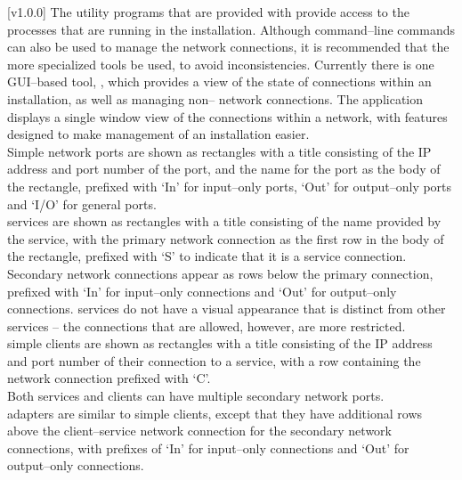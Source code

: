 [v1.0.0]
The utility programs that are provided with \mplusm{} provide access to the processes that
are running in the \mplusm{} installation.
Although command--line \yarp{} commands can also be used to manage the network
connections, it is recommended that the more specialized \mplusm{} tools be used, to avoid
inconsistencies.
Currently there is one GUI--based tool, ,
which provides a view of the state of connections within an \mplusm{} installation, as
well as managing non--\mplusm{} \yarp{} network connections.
The  application displays a single window
view of the connections within a \yarp{} network, with features designed to make
management of an \mplusm{} installation easier.\\

Simple \yarp{} network ports are shown as rectangles with a title consisting of the IP
address and port number of the port, and the \yarp{} name for the port as the body of the
rectangle, prefixed with `In' for input--only ports, `Out' for output--only ports and
`I/O' for general ports.\\

\mplusm{} services are shown as rectangles with a title consisting of the name provided by
the service, with the primary \yarp{} network connection as the first row in the body of
the rectangle, prefixed with `S' to indicate that it is a service connection.
Secondary \yarp{} network connections appear as rows below the primary connection,
prefixed with `In' for input--only connections and `Out' for output--only connections.
\mplusm{}  services do not have a visual appearance that is distinct from
other \mplusm{} services -- the connections that are allowed, however, are more
restricted.\\

\mplusm{} simple clients are shown as rectangles with a title consisting of the IP address
and port number of their connection to a service, with a row containing the \yarp{}
network connection prefixed with `C'.\\

Both \mplusm{} services and clients can have multiple secondary \yarp{} network ports.\\

\mplusm{} adapters are similar to \mplusm{} simple clients, except that they have
additional rows above the client--service \yarp{} network connection for the secondary
\yarp{} network connections, with prefixes of `In' for input--only connections and `Out'
for output--only connections.\\

